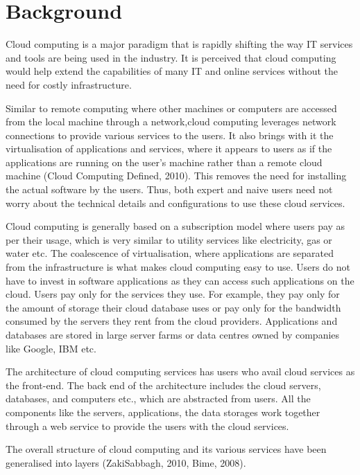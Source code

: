 \chapter{Background}

Cloud computing is a major paradigm that is rapidly shifting the way \ac{IT}
services and tools are being used in the industry. It is perceived that cloud
computing would help extend the capabilities of many \ac{IT} and online services
without the need for costly infrastructure.

Similar to remote computing where other machines or computers are accessed from
the local machine through a network,cloud computing leverages network
connections to provide various services to the users. It also brings with it the
virtualisation of applications and services, where it appears to users as if the
applications are running on the user's machine rather than a remote cloud
machine (Cloud Computing Defined, 2010). This removes the need for installing the actual
software by the users. Thus, both expert and naive users need not worry about
the technical details and configurations to use these cloud services.

Cloud computing is generally based on a subscription model where users pay as
per their usage, which is very similar to utility services like electricity, gas
or water etc. The coalescence of virtualisation, where applications are
separated from the infrastructure is what makes cloud computing easy to use.
Users do not have to invest in software applications as they can access
such applications on the cloud. Users pay only for the services they use. For
example, they pay only for the amount of storage their cloud database uses or
pay only for the bandwidth consumed by the servers they rent from the cloud
providers. Applications and databases are stored in large server farms or data
centres owned by companies like Google, IBM etc.

The architecture of cloud computing services has users who avail cloud services
as the front-end. The back end of the architecture includes the cloud servers,
databases, and computers etc., which are abstracted from users. All
the components like the servers, applications, the data storages work together
through a web service to provide the users with the cloud services.

The overall structure of cloud computing and its various services have been
generalised into layers (ZakiSabbagh, 2010, Bime, 2008).

